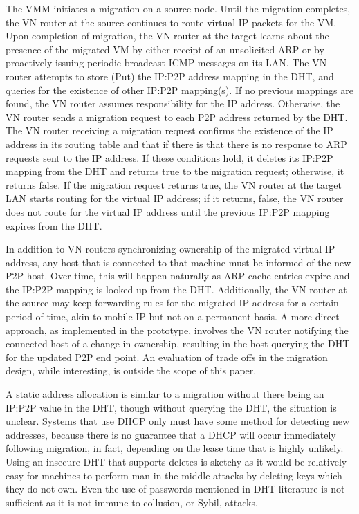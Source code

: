 The VMM initiates a migration on a source node. Until the migration completes,
the VN router at the source continues to route virtual IP packets for the VM.
Upon completion of migration, the VN router at the target learns about the
presence of the migrated VM by either receipt of an unsolicited ARP or by
proactively issuing periodic broadcast ICMP messages on its LAN.  The VN router
attempts to store (Put) the IP:P2P address mapping in the DHT, and queries for
the existence of other IP:P2P mapping(s). If no previous mappings are found,
the VN router assumes responsibility for the IP address. Otherwise, the VN
router sends a migration request to each P2P address returned by the DHT. The
VN router receiving a migration request confirms the existence of the IP
address in its routing table and that if there is that there is no response to
ARP requests sent to the IP address.  If these conditions hold, it deletes its
IP:P2P mapping from the DHT and returns true to the migration request;
otherwise, it returns false. If the migration request returns true, the VN
router at the target LAN starts routing for the virtual IP address; if it
returns, false, the VN router does not route for the virtual IP address until
the previous IP:P2P mapping expires from the DHT.

In addition to VN routers synchronizing ownership of the migrated virtual IP
address, any host that is connected to that machine must be informed of the new
P2P host.  Over time, this will happen naturally as ARP cache entries expire
and the IP:P2P mapping is looked up from the DHT.  Additionally, the VN router
at the source may keep forwarding rules for the migrated IP address for a
certain period of time, akin to mobile IP but not on a permanent basis.  A more
direct approach, as implemented in the prototype, involves the VN router
notifying the connected host of a change in ownership, resulting in the host
querying the DHT for the updated P2P end point.  An evaluation of trade offs in
the migration design, while interesting, is outside the scope of this paper. 

A static address allocation is similar to a migration without there being an
IP:P2P value in the DHT, though without querying the DHT, the situation is
unclear.  Systems that use DHCP only must have some method for detecting new
addresses, because there is no guarantee that a DHCP will occur immediately
following migration, in fact, depending on the lease time that is highly
unlikely.  Using an insecure DHT that supports deletes is sketchy as it would
be relatively easy for machines to perform man in the middle attacks by
deleting keys which they do not own.  Even the use of passwords mentioned in
DHT literature is not sufficient as it is not immune to collusion, or Sybil,
attacks.

